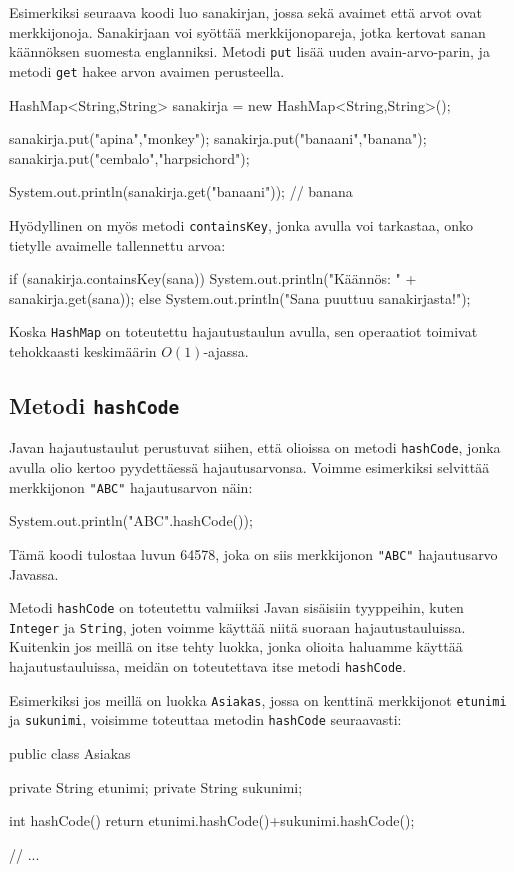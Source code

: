 Esimerkiksi seuraava koodi luo sanakirjan, jossa sekä
avaimet että arvot ovat merkkijonoja.
Sanakirjaan voi syöttää merkkijonopareja, jotka kertovat
sanan käännöksen suomesta englanniksi.
Metodi \texttt{put} lisää uuden avain-arvo-parin,
ja metodi \texttt{get} hakee arvon avaimen perusteella.

\begin{code}
HashMap<String,String> sanakirja = new HashMap<String,String>();

sanakirja.put("apina","monkey");
sanakirja.put("banaani","banana");
sanakirja.put("cembalo","harpsichord");

System.out.println(sanakirja.get("banaani")); // banana
\end{code}

Hyödyllinen on myös metodi \texttt{containsKey},
jonka avulla voi tarkastaa, onko tietylle avaimelle
tallennettu arvoa:

\begin{code}
if (sanakirja.containsKey(sana)) {
    System.out.println("Käännös: " + sanakirja.get(sana));
} else {
    System.out.println("Sana puuttuu sanakirjasta!");
}
\end{code}

Koska \texttt{HashMap} on toteutettu hajautustaulun avulla,
sen operaatiot toimivat tehokkaasti keskimäärin $O(1)$-ajassa.

\subsection{Metodi \texttt{hashCode}}

Javan hajautustaulut perustuvat siihen, että olioissa
on metodi \texttt{hashCode}, jonka avulla olio kertoo
pyydettäessä hajautusarvonsa.
Voimme esimerkiksi selvittää merkkijonon \texttt{"ABC"}
hajautusarvon näin:

\begin{code}
System.out.println("ABC".hashCode());
\end{code}

Tämä koodi tulostaa luvun 64578,
joka on siis merkkijonon \texttt{"ABC"} hajautusarvo Javassa.

Metodi \texttt{hashCode} on toteutettu valmiiksi Javan
sisäisiin tyyppeihin, kuten \texttt{Integer} ja \texttt{String},
joten voimme käyttää niitä suoraan hajautustauluissa.
Kuitenkin jos meillä on itse tehty luokka, jonka olioita
haluamme käyttää hajautustauluissa, meidän on toteutettava
itse metodi \texttt{hashCode}.

Esimerkiksi jos meillä on luokka \texttt{Asiakas},
jossa on kenttinä merkkijonot
\texttt{etunimi} ja \texttt{sukunimi},
voisimme toteuttaa metodin \texttt{hashCode} seuraavasti:

\begin{code}
public class Asiakas {
    private String etunimi;
    private String sukunimi;

    int hashCode() {
        return etunimi.hashCode()+sukunimi.hashCode();
    }

    // ...
}
\end{code}
